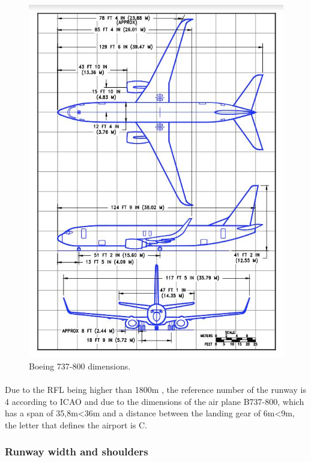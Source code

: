 		\begin{figure}[H]
			\centering
			\includegraphics[clip, trim=0cm 0cm 0cm 0cm, width=1\textwidth]{./images/B737/737}
			\caption{Boeing 737-800 dimensions.} %
			\label{} %
		\end{figure}
	
		\paragraph{}Due to the RFL being higher than 1800m , the reference number of the runway is 4 according to ICAO and due to the dimensions of the air plane B737-800, which has a span of 35,8m<36m and a distance between the landing gear of 6m<9m, the letter that defines the airport is C.
	
		\subsubsection{Runway width and shoulders}
